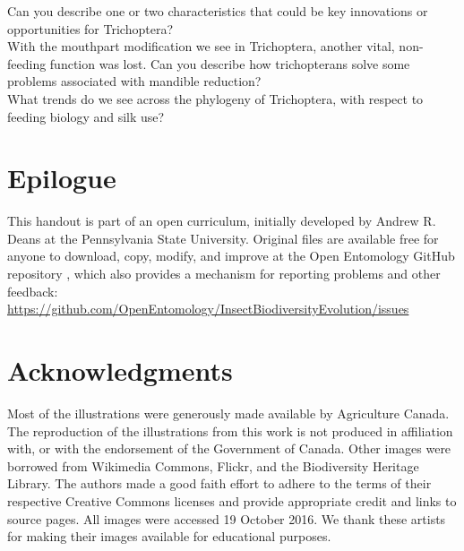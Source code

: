 \documentclass[letterpaper, 11pt]{article}
\begin{document}
\noindent{}Can you describe one or two characteristics that could be key innovations or opportunities for Trichoptera?\\

\noindent{}With the mouthpart modification we see in Trichoptera, another vital, non-feeding function was lost. Can you describe how trichopterans solve some problems associated with mandible reduction?\\

\noindent{}What trends do we see across the phylogeny of Trichoptera, with respect to feeding biology and silk use? \\

\FloatBarrier
\clearpage

\section*{Epilogue}
This handout is part of an open curriculum, initially developed by Andrew R. Deans at the Pennsylvania State University. Original files are available free for anyone to download, copy, modify, and improve at the Open Entomology GitHub repository \citep{ENT532}, which also provides a mechanism for reporting problems and other feedback:\\
\url{https://github.com/OpenEntomology/InsectBiodiversityEvolution/issues}

\section*{Acknowledgments}
Most of the illustrations were generously made available by Agriculture Canada. The reproduction of the illustrations from this work is not produced in affiliation with, or with the endorsement of the Government of Canada. Other images were borrowed from Wikimedia Commons, Flickr, and the Biodiversity Heritage Library. The authors made a good faith effort to adhere to the terms of their respective Creative Commons licenses and provide appropriate credit and links to source pages. All images were accessed 19 October 2016. We thank these artists for making their images available for educational purposes.

\FloatBarrier


\end{document}
